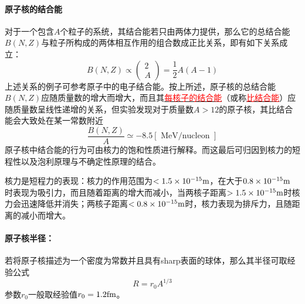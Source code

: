 \paragraph*{原子核的结合能}
对于一个包含$A$个粒子的系统，其结合能若只由两体力提供，那么它的总结合能$B(N,Z)$与粒子所构成的两体相互作用的组合数成正比关系，即有如下关系成立：
\begin{equation*}
	B(N, Z) \propto
	\begin{pmatrix}
		2	\\
		A
	\end{pmatrix}
	= \frac{1}{2} A(A-1)
\end{equation*} 
上述关系的例子可参考原子中的电子结合能。按上所述，原子核的总结合能$B(N,Z)$应随质量数的增大而增大，而且其\underline{\textcolor{red}{每核子的结合能}}（或称\underline{\textcolor{red}{比结合能}}）应随质量数呈线性递增的关系，但实验发现对于质量数$A > 12$的原子核，其比结合能会大致处在某一常数附近
\begin{equation}
	\frac{B(N, Z)}{A} \simeq -8.5 [\text{ MeV/nucleon }]  \label{eq_specific_binding_energy}
\end{equation} 
原子核中结合能的行为可由核力的饱和性质进行解释。而这最后可归因到核力的短程性以及泡利原理与不确定性原理的结合。
\begin{note}
	核力是短程力的表现：核力的作用范围为$< 1.5 \times 10^{-15} {\rm m}$，在大于$0.8 \times 10^{-15} {\rm m}$ 时表现为吸引力，而且随着距离的增大而减小，当两核子距离$> 1.5 \times 10^{-15} {\rm m}$时核力会迅速降低并消失；两核子距离$ < 0.8 \times 10^{-15} {\rm m}$时，核力表现为排斥力，且随距离的减小而增大。
\end{note}

\paragraph*{原子核半径：}若将原子核描述为一个密度为常数并且具有sharp表面的球体，那么其半径可取经验公式
\begin{equation}
	R = r_0 A^{1/3}	\label{eq_nuclear_radius}
\end{equation} 
参数$r_0$一般取经验值$r_0 = 1.2 {\rm fm}$。

